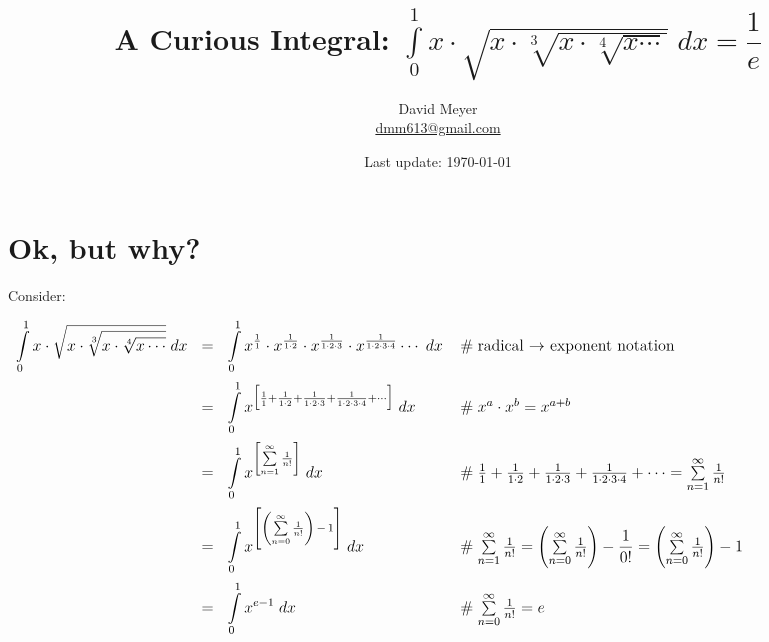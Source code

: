 \documentclass{article}
\title{A Curious Integral: ${\displaystyle \int\limits_{0}^{1} x \cdot 
	   		\sqrt{x \cdot \sqrt[3]{x \cdot \sqrt[4]{x \cdots}}}} \; dx = 
			\dfrac{1}{e}$}
\author{David Meyer \\ \href{mailto:dmm613@gmail.com}
                            {dmm613@gmail.com}}
\date{Last update: \today}
\theoremstyle{definition}
\begin{document}
\maketitle
%
%
%
\section{Ok, but why?}
\label{sec:introduction}

\bigskip
{\Large Consider:}

\begin{center}
      \begin{math}								%
      \fontsize{11.40}{8}
	   \begin{array}{llll}						%
	       {\displaystyle \int\limits_{0}^{1} x \cdot 
	   		\sqrt{x \cdot \sqrt[3]{x \cdot \sqrt[4]{x \cdots}}}} \; dx
	   &=& {\displaystyle \int\limits_{0}^{1} x^{\frac{1}{1}} \cdot x^{\frac{1}{1 \cdot 2}} \cdot 
	   		x^{\frac{1}{1 \cdot 2 \cdot 3}} \cdot x^{\frac{1}{1 \cdot 2 \cdot 3 \cdot 4}}}
			\cdots \; dx
			&\hspace{0.25em} \mathrel{\#} \text{radical $\rightarrow$ exponent notation} \\
[18pt]
		&=& {\displaystyle \int\limits_{0}^{1} x^{\big [ \frac{1}{1} + \frac{1}{1 \cdot 2} + 
	   		\frac{1}{1 \cdot 2 \cdot 3} + \frac{1}{1 \cdot 2 \cdot 3 \cdot 4} + 
			\cdots \big ]}} \; dx
			&\hspace{0.25em} \mathrel{\#} x^a \cdot x^b = x^{a+b} \\
[18pt]
		&=& {\displaystyle \int\limits_{0}^{1} x^{\left [\sum\limits_{n=1}^{\infty} \frac{1}{n!} \right ]} \; dx}
			&\hspace{0.25em} \mathrel{\#} \frac{1}{1} +\frac{1}{1\cdot 2} + \frac{1}{1\cdot 2 \cdot 3} + 
			\frac{1}{1 \cdot 2\cdot3\cdot 4} + \cdots = 
			\sum\limits_{n=1}^{\infty} \frac{1}{n!} \\
[18pt]
		&=& {\displaystyle \int\limits_{0}^{1} x^{\left [ \left ( \sum\limits_{n=0}^{\infty} \frac{1}{n!} \right ) 
											\, - \, 1 \right ]} \; dx}
			&\hspace{0.25em} \mathrel{\#} \sum\limits_{n=1}^{\infty} \frac{1}{n!} = 
											\left (\sum\limits _{n=0}^{\infty} \frac{1}{n!} \right ) - \dfrac{1}{0!} =
											\left (\sum\limits _{n=0}^{\infty} \frac{1}{n!} \right ) - 1\\
[18pt]
		&=& {\displaystyle \int\limits_{0}^{1} x^{e-1}} \; dx
			&\hspace{0.25em} \mathrel{\#}  \sum\limits _{n=0}^{\infty} \frac{1}{n!} = e  

\end{array}
\end{math}
\end{center}
\end{document}
